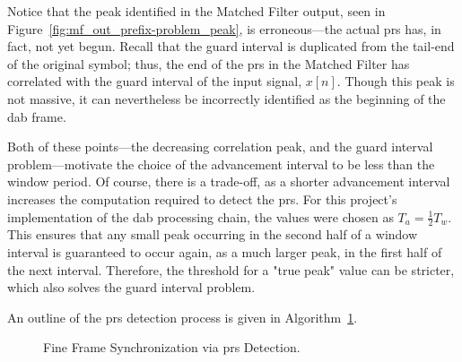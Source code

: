 \documentclass[class=report,11pt,crop=false]{standalone}
\begin{document}
Notice that the peak identified in the Matched Filter output, seen in Figure~\ref{fig:mf_out_prefix-problem_peak}, is erroneous---the actual \gls{prs} has, in fact, not yet begun. Recall that the guard interval is duplicated from the tail-end of the original symbol; thus, the end of the \gls{prs} in the Matched Filter has correlated with the guard interval of the input signal, \(x[n]\). Though this peak is not massive, it can nevertheless be incorrectly identified as the beginning of the \gls{dab} frame.

Both of these points---the decreasing correlation peak, and the guard interval problem---motivate the choice of the advancement interval to be less than the window period. Of course, there is a trade-off, as a shorter advancement interval increases the computation required to detect the \gls{prs}. For this project's implementation of the \gls{dab} processing chain, the values were chosen as \(T_a = \frac{1}{2} T_w\). This ensures that any small peak occurring in the second half of a window interval is guaranteed to occur again, as a much larger peak, in the first half of the next interval. Therefore, the threshold for a "true peak" value can be stricter, which also solves the guard interval problem.

An outline of the \gls{prs} detection process is given in Algorithm~\ref{alg:prs_detect}.

\begin{figure}[ht]
  \vspace{0.5cm}
  \centering
  \captionsetup{type=figure}
  \begin{minipage}{.75\linewidth}
    \begin{algorithm}[H]
      \caption{Fine Frame Synchronization via \gls{prs} Detection. \label{alg:prs_detect}}

      \DontPrintSemicolon
      \SetAlgoLined


      \BlankLine
      \vspace{0.5cm}
    \end{algorithm}
  \end{minipage}
\end{figure}
\end{document}
